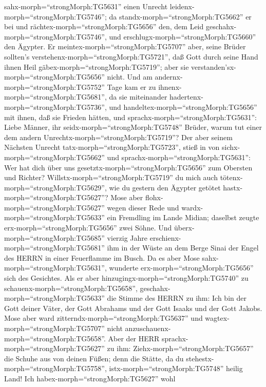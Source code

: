 sahx-morph=``strongMorph:TG5631'' einen Unrecht
leidenx-morph=``strongMorph:TG5746''; da
standx-morph=``strongMorph:TG5662'' er bei und
rächtex-morph=``strongMorph:TG5656'' den, dem Leid
geschahx-morph=``strongMorph:TG5746'', und
erschlugx-morph=``strongMorph:TG5660'' den Ägypter.  Er
meintex-morph=``strongMorph:TG5707'' aber, seine Brüder sollten's
verstehenx-morph=``strongMorph:TG5721'', daß Gott durch seine Hand ihnen
Heil gäbex-morph=``strongMorph:TG5719''; aber sie
verstanden'sx-morph=``strongMorph:TG5656'' nicht.  Und am
andernx-morph=``strongMorph:TG5752'' Tage kam er zu
ihnenx-morph=``strongMorph:TG5681'', da sie miteinander
hadertenx-morph=``strongMorph:TG5736'', und
handeltex-morph=``strongMorph:TG5656'' mit ihnen, daß sie Frieden
hätten, und sprachx-morph=``strongMorph:TG5631'': Liebe Männer, ihr
seidx-morph=``strongMorph:TG5748'' Brüder, warum tut einer dem andern
Unrechtx-morph=``strongMorph:TG5719''?  Der aber seinem
Nächsten Unrecht tatx-morph=``strongMorph:TG5723'', stieß in von
sichx-morph=``strongMorph:TG5662'' und
sprachx-morph=``strongMorph:TG5631'': Wer hat dich über uns
gesetztx-morph=``strongMorph:TG5656'' zum Obersten und Richter?
 Willstx-morph=``strongMorph:TG5719'' du mich auch
tötenx-morph=``strongMorph:TG5629'', wie du gestern den Ägypter getötet
hastx-morph=``strongMorph:TG5627''?  Mose aber
flohx-morph=``strongMorph:TG5627'' wegen dieser Rede und
wardx-morph=``strongMorph:TG5633'' ein Fremdling im Lande Midian;
daselbst zeugte erx-morph=``strongMorph:TG5656'' zwei Söhne.
 Und überx-morph=``strongMorph:TG5685'' vierzig Jahre
erschienx-morph=``strongMorph:TG5681'' ihm in der Wüste an dem Berge
Sinai der Engel des HERRN in einer Feuerflamme im Busch. 
Da es aber Mose sahx-morph=``strongMorph:TG5631'', wunderte
erx-morph=``strongMorph:TG5656'' sich des Gesichtes. Als er aber
hinzugingx-morph=``strongMorph:TG5740'' zu
schauenx-morph=``strongMorph:TG5658'',
geschahx-morph=``strongMorph:TG5633'' die Stimme des HERRN zu ihm:
 Ich bin der Gott deiner Väter, der Gott Abrahams und der
Gott Isaaks und der Gott Jakobs. Mose aber ward
zitterndx-morph=``strongMorph:TG5637'' und
wagtex-morph=``strongMorph:TG5707'' nicht
anzuschauenx-morph=``strongMorph:TG5658''.  Aber der HERR
sprachx-morph=``strongMorph:TG5627'' zu ihm:
Ziehx-morph=``strongMorph:TG5657'' die Schuhe aus von deinen Füßen; denn
die Stätte, da du stehestx-morph=``strongMorph:TG5758'',
istx-morph=``strongMorph:TG5748'' heilig Land!  Ich
habex-morph=``strongMorph:TG5627'' wohl
